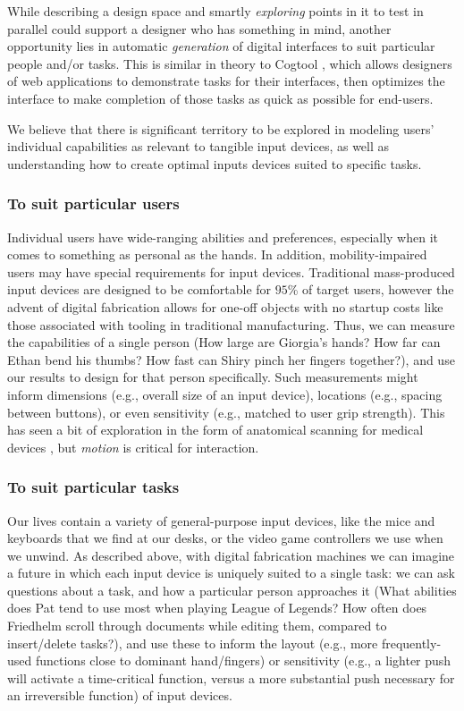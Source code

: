 While describing a design space and smartly \emph{exploring} points in it to test in parallel could support a designer who has something in mind, another opportunity lies in automatic \emph{generation} of digital interfaces to suit particular people and/or tasks. This is similar in theory to Cogtool \cite{john-cogtool}, which allows designers of web applications to demonstrate tasks for their interfaces, then optimizes the interface to make completion of those tasks as quick as possible for end-users.

We believe that there is significant territory to be explored in modeling users' individual capabilities as relevant to tangible input devices, as well as understanding how to create optimal inputs devices suited to specific tasks.

    \subsubsection{To suit particular users}

    Individual users have wide-ranging abilities and preferences, especially when it comes to something as personal as the hands. In addition, mobility-impaired users may have special requirements for input devices. Traditional mass-produced input devices are designed to be comfortable for $95$\% of target users, however the advent of digital fabrication allows for one-off objects with no startup costs like those associated with tooling in traditional manufacturing. Thus, we can measure the capabilities of a single person (How large are Giorgia's hands? How far can Ethan bend his thumbs? How fast can Shiry pinch her fingers together?), and use our results to design for that person specifically. Such measurements might inform dimensions (e.g., overall size of an input device), locations (e.g., spacing between buttons), or even sensitivity (e.g., matched to user grip strength). This has seen a bit of exploration in the form of anatomical scanning for medical devices \cite{smakman-curatio}, but \emph{motion} is critical for interaction.

    \subsubsection{To suit particular tasks}
    
    Our lives contain a variety of general-purpose input devices, like the mice and keyboards that we find at our desks, or the video game controllers we use when we unwind. As described above, with digital fabrication machines we can imagine a future in which each input device is uniquely suited to a single task: we can ask questions about a task, and how a particular person approaches it (What abilities does Pat tend to use most when playing League of Legends? How often does Friedhelm scroll through documents while editing them, compared to insert/delete tasks?), and use these to inform the layout (e.g., more frequently-used functions close to dominant hand/fingers) or sensitivity (e.g., a lighter push will activate a time-critical function, versus a more substantial push necessary for an irreversible function) of input devices.
    
